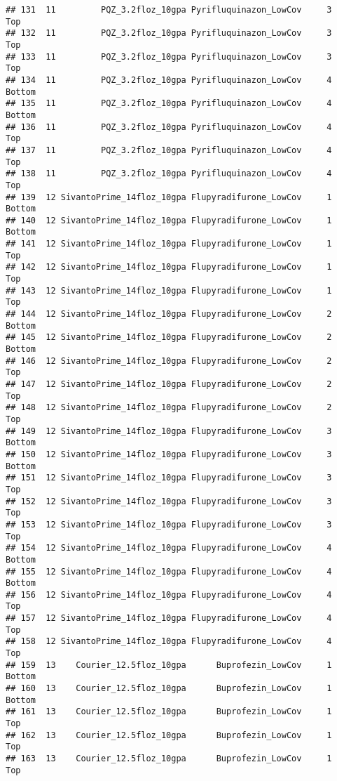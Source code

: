 \documentclass[
]{article}
\begin{document}
\begin{verbatim}
## 131  11         PQZ_3.2floz_10gpa Pyrifluquinazon_LowCov     3           Top
## 132  11         PQZ_3.2floz_10gpa Pyrifluquinazon_LowCov     3           Top
## 133  11         PQZ_3.2floz_10gpa Pyrifluquinazon_LowCov     3           Top
## 134  11         PQZ_3.2floz_10gpa Pyrifluquinazon_LowCov     4        Bottom
## 135  11         PQZ_3.2floz_10gpa Pyrifluquinazon_LowCov     4        Bottom
## 136  11         PQZ_3.2floz_10gpa Pyrifluquinazon_LowCov     4           Top
## 137  11         PQZ_3.2floz_10gpa Pyrifluquinazon_LowCov     4           Top
## 138  11         PQZ_3.2floz_10gpa Pyrifluquinazon_LowCov     4           Top
## 139  12 SivantoPrime_14floz_10gpa Flupyradifurone_LowCov     1        Bottom
## 140  12 SivantoPrime_14floz_10gpa Flupyradifurone_LowCov     1        Bottom
## 141  12 SivantoPrime_14floz_10gpa Flupyradifurone_LowCov     1           Top
## 142  12 SivantoPrime_14floz_10gpa Flupyradifurone_LowCov     1           Top
## 143  12 SivantoPrime_14floz_10gpa Flupyradifurone_LowCov     1           Top
## 144  12 SivantoPrime_14floz_10gpa Flupyradifurone_LowCov     2        Bottom
## 145  12 SivantoPrime_14floz_10gpa Flupyradifurone_LowCov     2        Bottom
## 146  12 SivantoPrime_14floz_10gpa Flupyradifurone_LowCov     2           Top
## 147  12 SivantoPrime_14floz_10gpa Flupyradifurone_LowCov     2           Top
## 148  12 SivantoPrime_14floz_10gpa Flupyradifurone_LowCov     2           Top
## 149  12 SivantoPrime_14floz_10gpa Flupyradifurone_LowCov     3        Bottom
## 150  12 SivantoPrime_14floz_10gpa Flupyradifurone_LowCov     3        Bottom
## 151  12 SivantoPrime_14floz_10gpa Flupyradifurone_LowCov     3           Top
## 152  12 SivantoPrime_14floz_10gpa Flupyradifurone_LowCov     3           Top
## 153  12 SivantoPrime_14floz_10gpa Flupyradifurone_LowCov     3           Top
## 154  12 SivantoPrime_14floz_10gpa Flupyradifurone_LowCov     4        Bottom
## 155  12 SivantoPrime_14floz_10gpa Flupyradifurone_LowCov     4        Bottom
## 156  12 SivantoPrime_14floz_10gpa Flupyradifurone_LowCov     4           Top
## 157  12 SivantoPrime_14floz_10gpa Flupyradifurone_LowCov     4           Top
## 158  12 SivantoPrime_14floz_10gpa Flupyradifurone_LowCov     4           Top
## 159  13    Courier_12.5floz_10gpa      Buprofezin_LowCov     1        Bottom
## 160  13    Courier_12.5floz_10gpa      Buprofezin_LowCov     1        Bottom
## 161  13    Courier_12.5floz_10gpa      Buprofezin_LowCov     1           Top
## 162  13    Courier_12.5floz_10gpa      Buprofezin_LowCov     1           Top
## 163  13    Courier_12.5floz_10gpa      Buprofezin_LowCov     1           Top

\end{verbatim}
\end{document}
